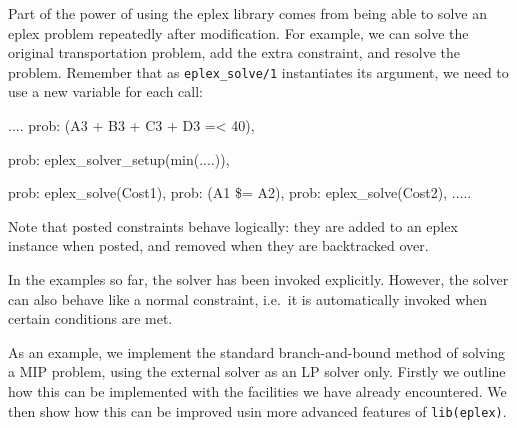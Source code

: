 Part of the power of using the eplex library comes from being able to solve
an eplex problem repeatedly after modification.
For example, we can solve the original transportation
problem, add the extra constraint, and resolve the problem.
Remember that as \verb'eplex_solve/1' instantiates its argument, we
need to use a new variable for each call:

{\small
\begin{code}
        .... %
        prob: (A3 + B3 + C3 + D3 =< 40),

        prob: eplex_solver_setup(min(....)), %

        prob: eplex_solve(Cost1),     %
        prob: (A1 \$= A2),
        prob: eplex_solve(Cost2),     %
        .....
\end{code}}

Note that posted constraints behave logically: they are added to an eplex
instance when posted, and removed when they are backtracked over.

In the examples so far, the solver has been invoked explicitly.
However, the solver can also behave like a normal constraint, i.e.\ it is
automatically invoked when certain conditions are met. 

As an example, we implement the standard branch-and-bound method of
solving a MIP problem, using the external solver as an LP solver only.
Firstly we outline how this can be
implemented with the facilities we have already encountered. We then show
how this can be improved usin more advanced features of \texttt{lib(eplex)}.

